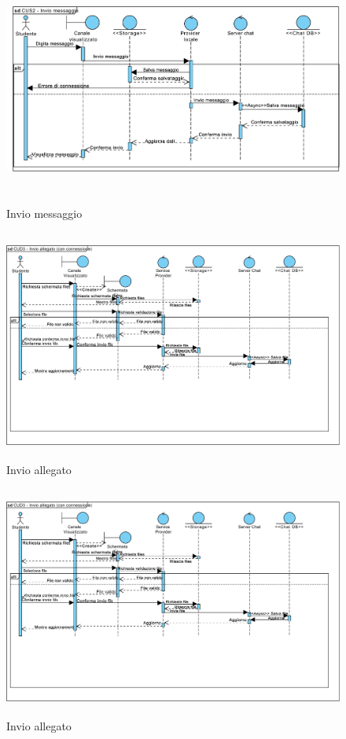 \begin{figure}
	\centering
	\includegraphics[height=3in,width=5in]{imgs/gruppo6/sequence/CUS2_invio_messaggio.pdf}
	\caption{Invio messaggio}
	\label{fig:prova}
\end{figure}

\begin{figure}
	\centering
	\includegraphics[height=3in,width=5in]{imgs/gruppo6/sequence/CUS3_invio_allegato.pdf}
	\caption{Invio allegato}
	\label{fig:prova}
\end{figure}

\begin{figure}
	\centering
	\includegraphics[height=3in,width=5in]{imgs/gruppo6/sequence/CUS3_invio_allegato.pdf}
	\caption{Invio allegato}
	\label{fig:prova}
\end{figure}

